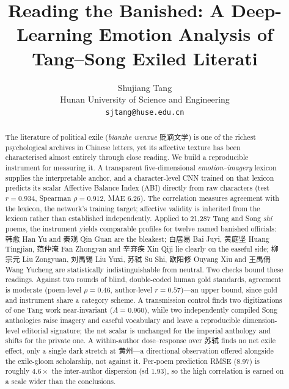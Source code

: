 \documentclass[10pt]{article}
\title{Reading the Banished: A Deep-Learning Emotion Analysis of
Tang--Song Exiled Literati}
\author{Shujiang Tang\\
Hunan University of Science and Engineering\\
\texttt{sjtang@huse.edu.cn}}
\date{}
\begin{document}
\maketitle

\begin{abstract}
The literature of political exile (\emph{bianzhe wenxue} 贬谪文学) is one of the
richest psychological archives in Chinese letters, yet its affective texture has
been characterised almost entirely through close reading. We build a reproducible
instrument for measuring it. A transparent five-dimensional \emph{emotion--imagery}
lexicon supplies the interpretable anchor, and a character-level CNN trained on that
lexicon predicts its scalar Affective Balance Index (ABI) directly from raw
characters (test $r{=}0.934$, Spearman $\rho{=}0.912$, MAE $6.26$). The correlation
measures agreement with the lexicon, the network's training target; affective
validity is inherited from the lexicon rather than established independently.
Applied to 21{,}287 Tang and Song \emph{shi} poems, the instrument yields comparable
profiles for twelve named banished officials: 韩愈 Han Yu and 秦观 Qin Guan are the
bleakest; 白居易 Bai Juyi, 黄庭坚 Huang Tingjian, 范仲淹 Fan Zhongyan and 辛弃疾 Xin
Qiji lie clearly on the easeful side; 柳宗元 Liu Zongyuan, 刘禹锡 Liu Yuxi, 苏轼 Su
Shi, 欧阳修 Ouyang Xiu and 王禹偁 Wang Yucheng are statistically indistinguishable
from neutral. Two checks bound these readings. Against two rounds of blind,
double-coded human gold standards, agreement is moderate (poem-level $\rho{=}0.46$,
author-level $r{=}0.57$)---an upper bound, since gold and instrument share a category
scheme. A transmission control finds two digitizations of one Tang work near-invariant
($A{=}0.960$), while two independently compiled Song anthologies raise imagery and
easeful vocabulary and leave a reproducible dimension-level editorial signature; the
net scalar is unchanged for the imperial anthology and shifts for the private one. A
within-author dose--response over 苏轼 finds no net exile effect, only a single dark
stretch at 黄州---a directional observation offered alongside the exile-gloom
scholarship, not against it. Per-poem prediction RMSE ($8.97$) is roughly $4.6\times$
the inter-author dispersion (sd $1.93$), so the high correlation is earned on a scale
wider than the conclusions.
\end{abstract}
\end{document}
